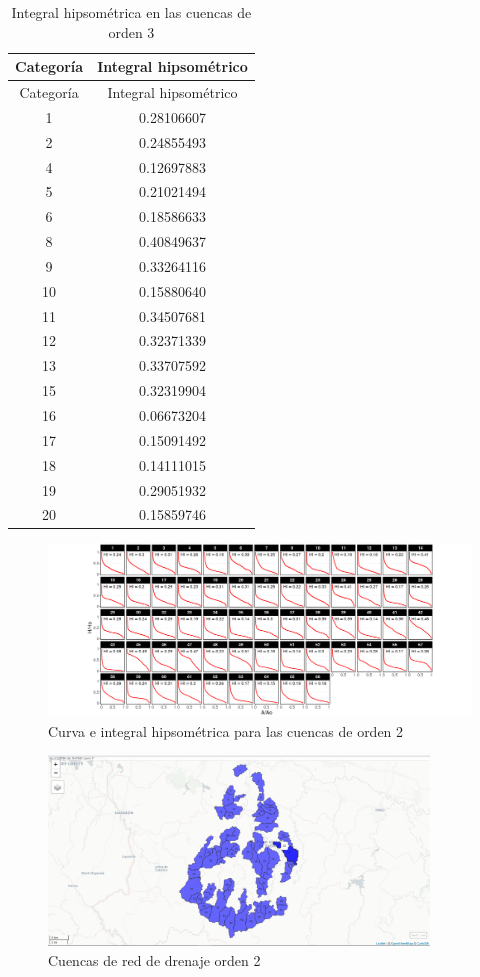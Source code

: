 \documentclass[11pt,]{article}
\begin{document}
\begin{longtable}[]{@{}cc@{}}
\caption{\label{ihco3} Integral hipsométrica en las cuencas de orden
3}\tabularnewline
\toprule
Categoría & Integral hipsométrico\tabularnewline
\midrule
\endfirsthead
\toprule
Categoría & Integral hipsométrico\tabularnewline
\midrule
\endhead
1 & 0.28106607\tabularnewline
2 & 0.24855493\tabularnewline
4 & 0.12697883\tabularnewline
5 & 0.21021494\tabularnewline
6 & 0.18586633\tabularnewline
8 & 0.40849637\tabularnewline
9 & 0.33264116\tabularnewline
10 & 0.15880640\tabularnewline
11 & 0.34507681\tabularnewline
12 & 0.32371339\tabularnewline
13 & 0.33707592\tabularnewline
15 & 0.32319904\tabularnewline
16 & 0.06673204\tabularnewline
17 & 0.15091492\tabularnewline
18 & 0.14111015\tabularnewline
19 & 0.29051932\tabularnewline
20 & 0.15859746\tabularnewline
\bottomrule
\end{longtable}

\begin{figure}
\centering
\includegraphics[width=1.10000\textwidth]{HypsoBasinOrder2.png}
\caption{Curva e integral hipsométrica para las cuencas de orden
2\label{hypsob2}}
\end{figure}

\begin{figure}
\centering
\includegraphics[width=0.90000\textwidth]{Mapview_hypsobasinorder2.png}
\caption{Cuencas de red de drenaje orden 2\label{hypb2}}
\end{figure}
\end{document}
